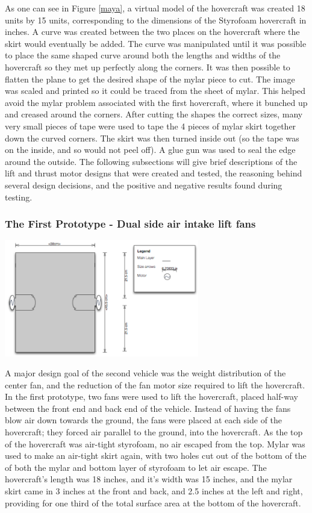 As one can see in Figure \ref{maya}, a virtual model of the hovercraft was created 18 units by 15 units, corresponding
to the dimensions of the Styrofoam hovercraft in inches.  A curve was created between the two places on the hovercraft where the skirt would eventually be added.
The curve was manipulated until it was possible to place the same shaped curve around both the lengths and widths of the hovercraft
so they met up perfectly along the corners. It was then possible to flatten the plane to get the desired shape of the mylar piece 
to cut. The image was scaled and printed so it could be traced from the sheet of mylar. This helped avoid the mylar
problem associated with the first hovercraft, where it bunched up and creased around the corners. After cutting the shapes the correct sizes,  many very small pieces of tape were used to tape the 4 pieces of mylar skirt together down the curved corners.  The skirt was then turned inside out (so the tape was on the inside,
and so would not peel off).  A glue gun was used to seal the edge around the outside.  The following subsections will give
brief descriptions of the lift and thrust motor designs that were created and tested, the reasoning behind several design decisions, and the positive and negative results found during testing.

\subsubsection{The First Prototype - Dual side air intake lift fans}
\begin{center}
  \includegraphics[width=85mm]{imageSources/top2.png}
\end{center}
\label{top2}

A major design goal of the second vehicle was the weight distribution of the center fan, and the reduction of the fan motor size required to lift the hovercraft. In the first
prototype, two fans were used to lift the hovercraft, placed half-way between the front end
and back end of the vehicle. Instead of having the fans blow air down towards the ground, the fans were placed at each side
of the hovercraft; they forced air parallel to the ground, into the hovercraft. As the top of the hovercraft was
air-tight styrofoam, no air escaped from the top.  Mylar was used to make an air-tight skirt again, with two holes cut out
of the bottom of the of both the mylar and bottom layer of styrofoam to let air escape. The hovercraft's length was 18 inches,
and it's width was 15 inches, and the mylar skirt came in 3 inches at the front and back, and 2.5 inches at the left and right,
providing for one third of the total surface area at the bottom of the hovercraft.

